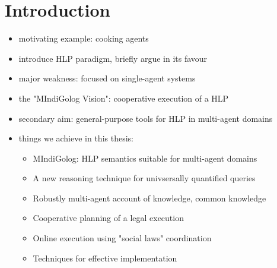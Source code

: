 \chapter{Introduction}
\minitoc
\onehalfspace

\begin{itemize}
\item motivating example: cooking agents
\item introduce HLP paradigm, briefly argue in its favour
\item major weakness: focused on single-agent systems
\item the "MIndiGolog Vision": cooperative execution of a HLP
\item secondary aim: general-purpose tools for HLP in multi-agent domains
\item things we achieve in this thesis:
  \begin{itemize}
  \item MIndiGolog: HLP semantics suitable for multi-agent domains
  \item A new reasoning technique for univsersally quantified queries
  \item Robustly multi-agent account of knowledge, common knowledge
  \item Cooperative planning of a legal execution
  \item Online execution using "social laws" coordination
  \item Techniques for effective implementation
  \end{itemize}
\end{itemize}

